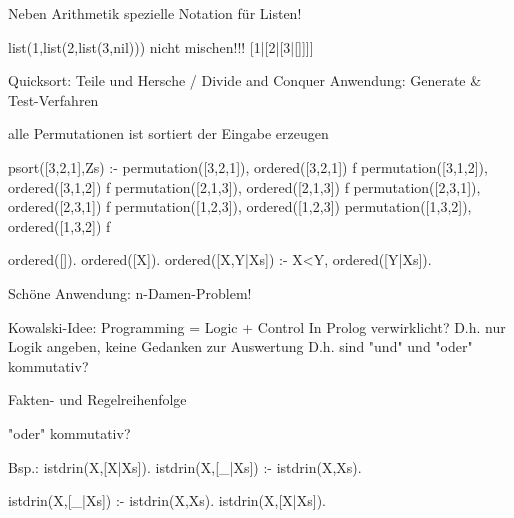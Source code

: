 Neben Arithmetik spezielle Notation für Listen!

list(1,list(2,list(3,nil)))
								nicht mischen!!!
[1|[2|[3|[]]]]

Quicksort: Teile und Hersche / Divide and Conquer
Anwendung: Generate & Test-Verfahren

alle Permutationen			ist sortiert
der Eingabe erzeugen

psort([3,2,1],Zs) :- permutation([3,2,1]), ordered([3,2,1]) f
					 permutation([3,1,2]), ordered([3,1,2]) f
					 permutation([2,1,3]), ordered([2,1,3]) f
					 permutation([2,3,1]), ordered([2,3,1]) f
					 permutation([1,2,3]), ordered([1,2,3]) 
					 permutation([1,3,2]), ordered([1,3,2]) f
					 
ordered([]).
ordered([X]).
ordered([X,Y|Xs]) :- X<Y, ordered([Y|Xs]).

Schöne Anwendung: n-Damen-Problem!



Kowalski-Idee: Programming = Logic + Control
			   In Prolog verwirklicht?
			   D.h. nur Logik angeben, keine Gedanken zur Auswertung
			   D.h. sind "und" und "oder" kommutativ?

Fakten- und Regelreihenfolge

"oder" kommutativ?

Bsp.:
istdrin(X,[X|Xs]).
istdrin(X,[_|Xs]) :- istdrin(X,Xs).



istdrin(X,[_|Xs]) :- istdrin(X,Xs).
istdrin(X,[X|Xs]).			   